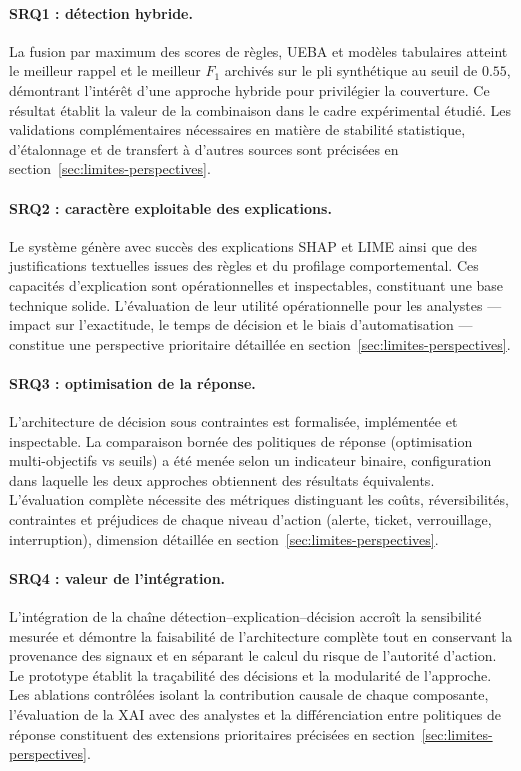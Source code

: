 \documentclass[11pt,a4paper,oneside]{report}
\theoremstyle{definition}
\theoremstyle{plain}
\begin{document}
\paragraph{SRQ1 : détection hybride.}
La fusion par maximum des scores de règles, UEBA et modèles tabulaires atteint le meilleur rappel et le meilleur \(F_1\) archivés sur le pli synthétique au seuil de \(0.55\), démontrant l'intérêt d'une approche hybride pour privilégier la couverture. Ce résultat établit la valeur de la combinaison dans le cadre expérimental étudié. Les validations complémentaires nécessaires en matière de stabilité statistique, d'étalonnage et de transfert à d'autres sources sont précisées en section~\ref{sec:limites-perspectives}.

\paragraph{SRQ2 : caractère exploitable des explications.}
Le système génère avec succès des explications SHAP et LIME ainsi que des justifications textuelles issues des règles et du profilage comportemental. Ces capacités d'explication sont opérationnelles et inspectables, constituant une base technique solide. L'évaluation de leur utilité opérationnelle pour les analystes --- impact sur l'exactitude, le temps de décision et le biais d'automatisation --- constitue une perspective prioritaire détaillée en section~\ref{sec:limites-perspectives}.

\paragraph{SRQ3 : optimisation de la réponse.}
L'architecture de décision sous contraintes est formalisée, implémentée et inspectable. La comparaison bornée des politiques de réponse (optimisation multi-objectifs vs seuils) a été menée selon un indicateur binaire, configuration dans laquelle les deux approches obtiennent des résultats équivalents. L'évaluation complète nécessite des métriques distinguant les coûts, réversibilités, contraintes et préjudices de chaque niveau d'action (alerte, ticket, verrouillage, interruption), dimension détaillée en section~\ref{sec:limites-perspectives}.

\paragraph{SRQ4 : valeur de l'intégration.}
L'intégration de la chaîne détection--explication--décision accroît la sensibilité mesurée et démontre la faisabilité de l'architecture complète tout en conservant la provenance des signaux et en séparant le calcul du risque de l'autorité d'action. Le prototype établit la traçabilité des décisions et la modularité de l'approche. Les ablations contrôlées isolant la contribution causale de chaque composante, l'évaluation de la XAI avec des analystes et la différenciation entre politiques de réponse constituent des extensions prioritaires précisées en section~\ref{sec:limites-perspectives}.
\end{document}
